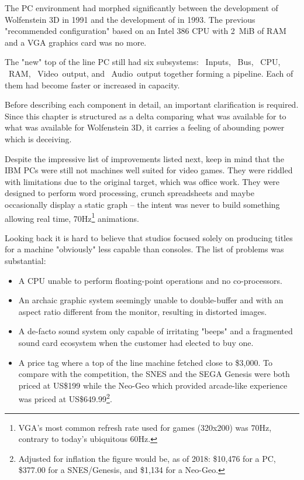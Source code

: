 The PC environment had morphed significantly between the development of Wolfenstein 3D in 1991 and the development of \doom{} in 1993. The previous "recommended configuration" based on an Intel 386 CPU with 2~MiB of RAM and a VGA graphics card was no more.\\
\par
The "new" top of the line PC still had six subsystems: ~Inputs, ~Bus, ~CPU, ~RAM, ~Video~output, and ~Audio~output together forming a pipeline. Each of them had become faster or increased in capacity.\\
\par
\vspace{2mm}
\par
 Before describing each component in detail, an important clarification is required. Since this chapter is structured as a delta comparing what was available for \doom{} to what was available for Wolfenstein 3D, it carries a feeling of abounding power which is deceiving. \\
 \par
 Despite the impressive list of improvements listed next, keep in mind that the IBM PCs were still not machines well suited for video games. They were riddled with limitations due to the original target, which was office work. They were designed to perform word processing, crunch spreadsheets and maybe occasionally display a static graph -- the intent was never to build something allowing real time, 70Hz\footnote{VGA's most common refresh rate used for games (320x200) was 70Hz, contrary to today's ubiquitous 60Hz.} animations.\\ 
\par 
Looking back it is hard to believe that studios focused solely on producing titles for a machine "obviously" less capable than consoles. The list of problems was substantial:
\begin{itemize}
\item A CPU unable to perform floating-point operations and no co-processors.
\item An archaic graphic system seemingly unable to double-buffer and with an aspect ratio different from the monitor, resulting in distorted images.
\item A de-facto sound system only capable of irritating "beeps" and a fragmented sound card ecosystem when the customer had elected to buy one.
\item A price tag where a top of the line machine fetched close to \$3,000. To compare with the competition, the SNES and the SEGA Genesis were both priced at US\$199 while the Neo-Geo which provided arcade-like experience was priced at US\$649.99\footnote{Adjusted for inflation the figure would be, as of 2018: \$10,476 for a PC, \$377.00 for a SNES/Genesis, and \$1,134 for a Neo-Geo.}.
\end{itemize}
